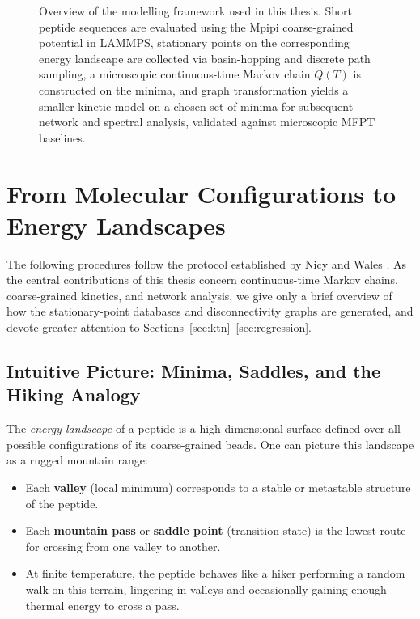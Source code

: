 \begin{figure}[ht]
  \caption{Overview of the modelling framework used in this thesis. Short peptide sequences are evaluated using the Mpipi coarse-grained potential in LAMMPS, stationary points on the corresponding energy landscape are collected via basin-hopping and discrete path sampling, a microscopic continuous-time Markov chain $Q(T)$ is constructed on the minima, and graph transformation yields a smaller kinetic model on a chosen set of minima for subsequent network and spectral analysis, validated against microscopic MFPT baselines.}
  \label{fig:framework-overview}
\end{figure}



\section{From Molecular Configurations to Energy Landscapes}\label{sec:method_disconnectivity}

The following procedures follow the protocol established by Nicy and Wales
\cite{Nicy2024Mpipi,Wales2023PeptideTrees}. As the central contributions of this
thesis concern continuous-time Markov chains, coarse-grained kinetics, and network
analysis, we give only a brief overview of how the stationary-point databases and
disconnectivity graphs are generated, and devote greater attention to
Sections~\ref{sec:ktn}--\ref{sec:regression}.

\subsection{Intuitive Picture: Minima, Saddles, and the Hiking Analogy}\label{subsec:intuition}

The \emph{energy landscape} of a peptide is a high-dimensional surface defined over
all possible configurations of its coarse-grained beads. One can picture this landscape
as a rugged mountain range:

\begin{itemize}
  \item Each \textbf{valley} (local minimum) corresponds to a stable or metastable
        structure of the peptide.
  \item Each \textbf{mountain pass} or \textbf{saddle point} (transition state) is
        the lowest route for crossing from one valley to another.
  \item At finite temperature, the peptide behaves like a hiker performing a random
        walk on this terrain, lingering in valleys and occasionally gaining enough
        thermal energy to cross a pass.
\end{itemize}

